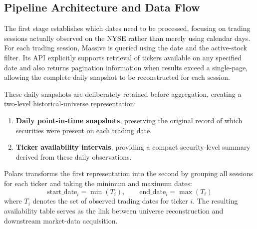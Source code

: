 \subsection{Pipeline Architecture and Data Flow}
The first stage establishes which dates need to be processed, focusing on trading sessions actually observed on the \acs{NYSE} rather than merely using calendar days. For each trading session, Massive is queried using the date and the active-stock filter. Its \acs{API} explicitly supports retrieval of tickers available on any specified date and also returns pagination information when results exceed a single-page, allowing the complete daily snapshot to be reconstructed for each session.

\medskip

These daily snapshots are deliberately retained before aggregation, creating a two-level historical-universe representation:
\begin{enumerate}[topsep=0pt, parsep=0pt, itemsep=0pt]
    \item \textbf{Daily point-in-time snapshots}, preserving the original record of which securities were present on each trading date.
    \item \textbf{Ticker availability intervals}, providing a compact security-level summary derived from these daily observations.
\end{enumerate}

Polars transforms the first representation into the second by grouping all sessions for each ticker and taking the minimum and maximum dates:
\[
    \mathrm{start\_date}_i = \min(T_i), \qquad
    \mathrm{end\_date}_i = \max(T_i)
\]
where \(T_i\) denotes the set of observed trading dates for ticker \(i\). The resulting availability table serves as the link between universe reconstruction and downstream market-data acquisition.

\medskip

